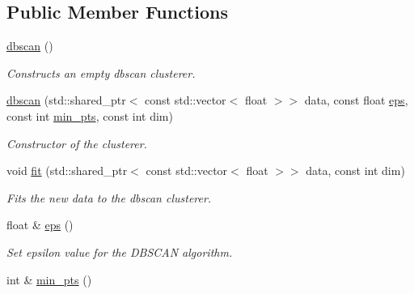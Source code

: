 \subsection*{Public Member Functions}
\begin{DoxyCompactItemize}
\item 
\hypertarget{classcluster_1_1dbscan_a417c95b96d2ace97d6b0294558b93f64}{}\hyperlink{classcluster_1_1dbscan_a417c95b96d2ace97d6b0294558b93f64}{dbscan} ()\label{classcluster_1_1dbscan_a417c95b96d2ace97d6b0294558b93f64}

\begin{DoxyCompactList}\small\item\em Constructs an empty dbscan clusterer. \end{DoxyCompactList}\item 
\hyperlink{classcluster_1_1dbscan_af77dacb349da6976a3521297a6b50d0d}{dbscan} (std\+::shared\+\_\+ptr$<$ const std\+::vector$<$ float $>$$>$ data, const float \hyperlink{classcluster_1_1dbscan_adffe3dee8aede13ce2068552a38e4bb9}{eps}, const int \hyperlink{classcluster_1_1dbscan_a5f424fb02ca1d736fb07f9e214a01a65}{min\+\_\+pts}, const int dim)
\begin{DoxyCompactList}\small\item\em Constructor of the clusterer. \end{DoxyCompactList}\item 
\hypertarget{classcluster_1_1dbscan_a6beb8bf84f9d9bc5271f280b0ed0e26f}{}void \hyperlink{classcluster_1_1dbscan_a6beb8bf84f9d9bc5271f280b0ed0e26f}{fit} (std\+::shared\+\_\+ptr$<$ const std\+::vector$<$ float $>$$>$ data, const int dim)\label{classcluster_1_1dbscan_a6beb8bf84f9d9bc5271f280b0ed0e26f}

\begin{DoxyCompactList}\small\item\em Fits the new data to the dbscan clusterer. \end{DoxyCompactList}\item 
\hypertarget{classcluster_1_1dbscan_adffe3dee8aede13ce2068552a38e4bb9}{}float \& \hyperlink{classcluster_1_1dbscan_adffe3dee8aede13ce2068552a38e4bb9}{eps} ()\label{classcluster_1_1dbscan_adffe3dee8aede13ce2068552a38e4bb9}

\begin{DoxyCompactList}\small\item\em Set epsilon value for the D\+B\+S\+C\+A\+N algorithm. \end{DoxyCompactList}\item 
\hypertarget{classcluster_1_1dbscan_a5f424fb02ca1d736fb07f9e214a01a65}{}int \& \hyperlink{classcluster_1_1dbscan_a5f424fb02ca1d736fb07f9e214a01a65}{min\+\_\+pts} ()\label{classcluster_1_1dbscan_a5f424fb02ca1d736fb07f9e214a01a65}


\end{DoxyCompactItemize}
